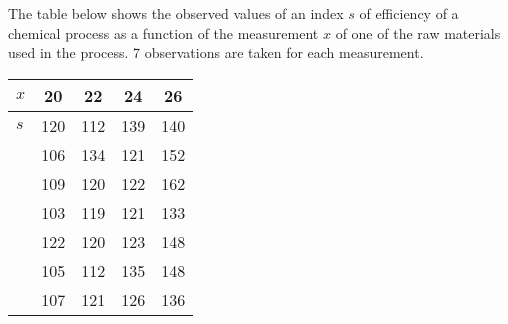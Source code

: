 \else

\question The table below shows the observed values of an index $s$ of efficiency of a chemical process as
a function of the measurement $x$ of one of the raw materials used in the process. 7 observations
are taken for each measurement.
 \begin{center} 
   \begin{tabular}{|| l |c|c|c|c ||}
     \hline $x$ & 20 & 22 & 24 & 26 \\ \hline \hline
	   $s$ & 120 & 112 & 139 & 140 \\
	       & 106 & 134  & 121  & 152  \\ 
	       & 109 & 120  & 122  & 162  \\
	       & 103 & 119  & 121  & 133  \\
	       & 122 & 120  & 123  & 148  \\
	       & 105 & 112  & 135  & 148  \\
	       & 107 & 121  & 126  & 136  \\ \hline 
   \end{tabular}
 \end{center}

\begin{solution}
 \end{solution}

\fi